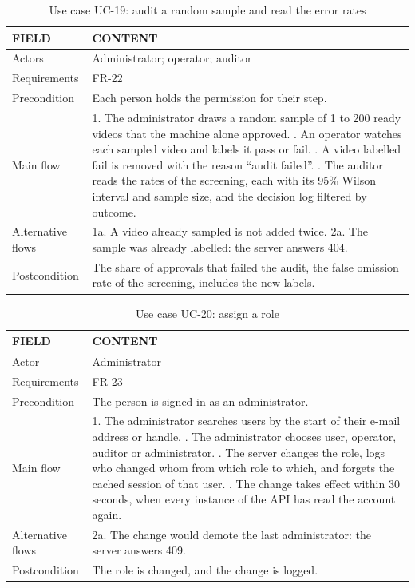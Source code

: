 \begin{table}[H]
\centering
\caption{Use case UC-19: audit a random sample and read the error rates}
\label{tab:uc-audit}
\small
\begin{tabularx}{\textwidth}{p{} X}
\toprule
\textbf{FIELD} & \textbf{CONTENT} \\
\midrule
Actors & Administrator; operator; auditor \\
Requirements & FR-22 \\
Precondition & Each person holds the permission for their step. \\
Main flow &
  1. The administrator draws a random sample of 1 to 200 ready videos that the machine alone approved. \newline
  2. An operator watches each sampled video and labels it pass or fail. \newline
  3. A video labelled fail is removed with the reason ``audit failed''. \newline
  4. The auditor reads the rates of the screening, each with its 95\% Wilson interval and sample size, and the decision log filtered by outcome. \\
Alternative flows &
  1a. A video already sampled is not added twice. \newline
  2a. The sample was already labelled: the server answers 404. \\
Postcondition & The share of approvals that failed the audit, the false omission rate of the screening, includes the new labels. \\
\bottomrule
\end{tabularx}
\end{table}

\begin{table}[H]
\centering
\caption{Use case UC-20: assign a role}
\label{tab:uc-role}
\small
\begin{tabularx}{\textwidth}{p{} X}
\toprule
\textbf{FIELD} & \textbf{CONTENT} \\
\midrule
Actor & Administrator \\
Requirements & FR-23 \\
Precondition & The person is signed in as an administrator. \\
Main flow &
  1. The administrator searches users by the start of their e-mail address or handle. \newline
  2. The administrator chooses user, operator, auditor or administrator. \newline
  3. The server changes the role, logs who changed whom from which role to which, and forgets the cached session of that user. \newline
  4. The change takes effect within 30 seconds, when every instance of the API has read the account again. \\
Alternative flows &
  2a. The change would demote the last administrator: the server answers 409. \\
Postcondition & The role is changed, and the change is logged. \\
\bottomrule
\end{tabularx}
\end{table}

